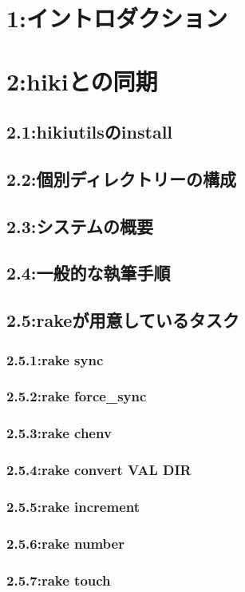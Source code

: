 \section{1:イントロダクション}
\section{2:hikiとの同期}
\subsection{2.1:hikiutilsのinstall}
\subsection{2.2:個別ディレクトリーの構成}
\subsection{2.3:システムの概要}
\subsection{2.4:一般的な執筆手順}
\subsection{2.5:rakeが用意しているタスク}
\subsubsection{2.5.1:rake sync}
\subsubsection{2.5.2:rake force\_sync}
\subsubsection{2.5.3:rake chenv}
\subsubsection{2.5.4:rake convert VAL DIR}
\subsubsection{2.5.5:rake increment}
\subsubsection{2.5.6:rake number}
\subsubsection{2.5.7:rake touch}
